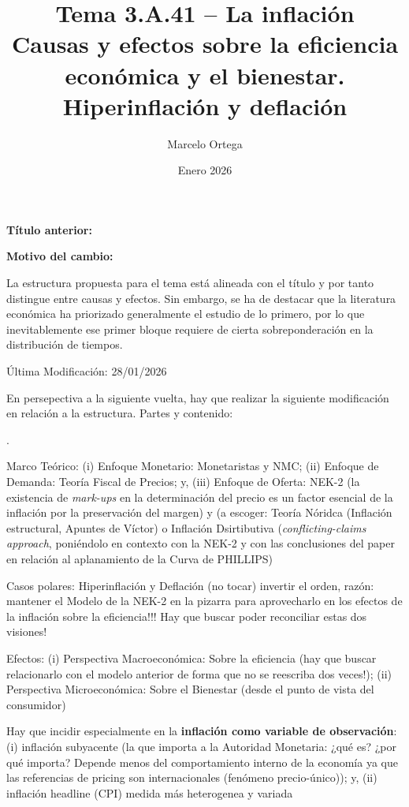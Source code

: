 \documentclass[10pt,a4paper]{article}
\title{Tema 3.A.41 -- La inflación\\
\large Causas y efectos sobre la eficiencia económica y el bienestar. Hiperinflación y deflación}
\author{Marcelo Ortega}
\date{Enero 2026}
\newcounter{numitem}
\newcommand{\puntosclave}[1]{%
  \begin{tcolorbox}[
    colframe=black,
    title={Puntos clave},
    before upper={\setlength{\parindent}{0.5cm}\setlength{\parskip}{0.5\baselineskip}}
  ]
  #1
  \end{tcolorbox}
}
\newcommand{\modificaciones}[1]{
  \begin{tcolorbox}[
    colback=white,
    colframe=red,
    title={Modificaciones a realizar},
    before upper={\setlength{\parindent}{0.5cm}\setlength{\parskip}{0.5\baselineskip}}
  ]
  #1
  \end{tcolorbox}
}
\newenvironment{lnum}
      {\begin{list}{\arabic{numitem}.}{%
          \usecounter{numitem}%
          \setlength{\leftmargin}{1cm}%
          \setlength{\parskip}{3pt}%
          \setlength{\itemsep}{0pt}%
          \setlength{\parsep}{0pt}%
      }}
      {\end{list}}
\newcommand{\changebox}{%
\begin{tcolorbox}[title={Historial de cambios del tema}]
\textbf{Título anterior:} \OldTitle\par
\textbf{Motivo del cambio:} \ChangeWhy
\end{tcolorbox}
}
\begin{document}
\maketitle
\changebox

\newpage

\puntosclave{ %
     La estructura propuesta para el tema está alineada con el título y por tanto distingue entre causas y efectos. Sin embargo, se ha de destacar que la literatura económica ha priorizado generalmente el estudio de lo primero, por lo que inevitablemente ese primer bloque requiere de cierta sobreponderación en la distribución de tiempos.
    }
\vspace{1cm}

\modificaciones{
    Última Modificación: 28/01/2026

    En persepectiva a la siguiente vuelta, hay que realizar la siguiente modificación en relación a la estructura. Partes y contenido:
    \begin{lnum}
        \item Marco Teórico: (i) Enfoque Monetario: Monetaristas y NMC; (ii) Enfoque de Demanda: Teoría Fiscal de Precios; y, (iii) Enfoque de Oferta: NEK-2 (la existencia de \textit{mark-ups} en la determinación del precio es un factor esencial de la inflación por la preservación del margen) y (a escoger: Teoría Nóridca (Inflación estructural, Apuntes de Víctor) o Inflación Dsirtibutiva (\textit{conflicting-claims approach}, poniéndolo en contexto con la NEK-2 y con las conclusiones del paper en relación al aplanamiento de la Curva de PHILLIPS)
        \item  Casos polares: Hiperinflación y Deflación (no tocar) invertir el orden, razón: mantener el Modelo de la NEK-2 en la pizarra para aprovecharlo en los efectos de la inflación sobre la eficiencia!!! Hay que buscar poder reconciliar estas dos visiones!
        \item Efectos: (i) Perspectiva Macroeconómica: Sobre la eficiencia (hay que buscar relacionarlo con el modelo anterior de forma que no se reescriba dos veces!); (ii) Perspectiva Microeconómica: Sobre el Bienestar (desde el punto de vista del consumidor)
    \end{lnum}

    Hay que incidir especialmente en la \textbf{inflación como variable de observación}: (i) inflación subyacente (la que importa a la Autoridad Monetaria: ¿qué es? ¿por qué importa? Depende menos del comportamiento interno de la economía ya que las referencias de pricing son internacionales (fenómeno precio-único)); y, (ii) inflación headline (CPI) medida más heterogenea y variada

}
\end{document}

